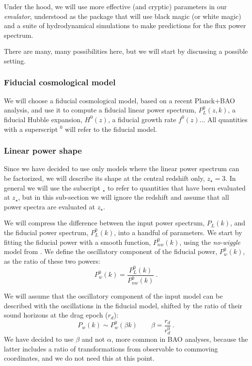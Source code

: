 Under the hood, we will use more effective (and cryptic) parameters in our 
\textit{emulator}, understood as the package that will use black magic 
(or white magic) and a suite of hydrodynamical simulations to make 
predictions for the flux power spectrum.

There are many, many possibilities here, but we will start by discussing a 
possible setting. 

\subsubsection{Fiducial cosmological model}
 
We will choose a fiducial cosmological model, based on a recent Planck+BAO 
analysis, and use it to compute a fiducial linear power spectrum, $P_L^0(z,k)$, 
a fiducial Hubble expansion, $H^0(z)$, a fiducial growth rate $f^0(z)$...
All quantities with a superscript $^0$ will refer to the fiducial model.

\subsubsection{Linear power shape}

Since we have decided to use only models where the linear power spectrum 
can be factorized, we will describe its shape at the central redshift only, 
$z_\star=3$. 
In general we will use the subscript $_\star$ to refer to quantities that 
have been evaluated at $z_\star$, but in this sub-section we will ignore 
the redshift and assume that all power spectra are evaluated at $z_\star$.

We will compress the difference between the input power spectrum, $P_L(k)$, 
and the fiducial power spectrum, $P^0_L(k)$, into a handful of parameters. 
We start by fitting the fiducial power with a smooth function, 
$P^0_{nw}(k)$, using the \textit{no-wiggle} model from \cite{Eisenstein1998}.
We define the oscillatory component of the fiducial power, $P^0_w(k)$, as the 
ratio of these two powers:
\begin{equation}
 P^0_w(k) = \frac{P^0_L(k)}{P^0_{nw}(k)} ~.
\end{equation} 

We will assume that the oscillatory component of the input model can be 
described with the oscillations in the fiducial model, shifted by the ratio 
of their sound horizons at the drag epoch ($r_d$):
\begin{equation}
 P_w(k) \sim P^0_w(\beta k)  
\qquad  
 \beta = \frac{r_d}{r^0_d} ~.
\end{equation}
We have decided to use $\beta$ and not $\alpha$, more common in BAO analyses,
because the latter includes a ratio of transformations from observable to 
commoving coordinates, and we do not need this at this point. 

